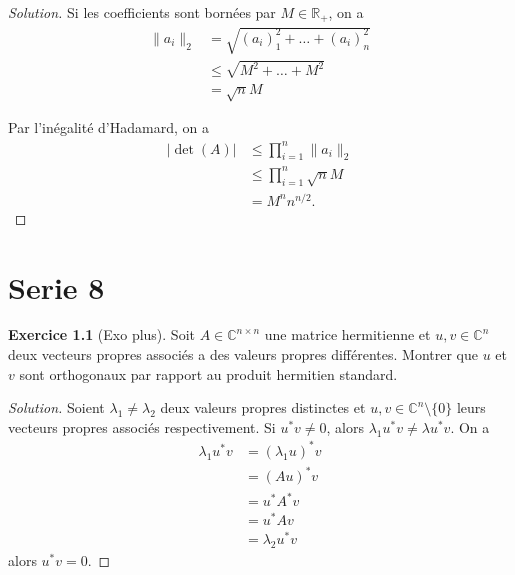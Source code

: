 \documentclass[a4paper,12pt,french]{report}
\theoremstyle{plain}
\theoremstyle{definition}
\newtheorem{exercise}{Exercice}[chapter]
\begin{document}
\begin{proof}[Solution]
Si les coefficients sont bornées par $M\in \mathbb{R}_{+}$, on a 
\begin{align*}
\lVert a_{i} \rVert _{2} & =\sqrt{ (a_{i})_{1}^{2}+\dots +(a_{i})_{n}^{2} } \\
 & \le \sqrt{ M^{2}+\dots +M^{2} } \\
 & =\sqrt{ n }M
\end{align*}

Par l'inégalité d'Hadamard, on a 
\begin{align*}
|\det(A)| & \le \prod_{i=1}^{n} \lVert a_{i}\rVert_{2} \\
 & \le \prod_{i=1}^{n} \sqrt{ n }M \\
  & =M^{n}n^{n/2}.
\end{align*}
\end{proof}

\chapter{Serie 8}

\begin{exercise}[Exo plus]
Soit $A\in \mathbb{C}^{n\times n}$ une matrice hermitienne et $u,v\in \mathbb{C}^{n}$ deux vecteurs propres associés a des valeurs propres différentes. Montrer que $u$ et $v$ sont orthogonaux par rapport au produit hermitien standard.
\end{exercise}
\begin{proof}[Solution]
Soient $\lambda_{1}\neq\lambda_{2}$ deux valeurs propres distinctes et $u,v\in \mathbb{C}^{n}\setminus \{ 0 \}$ leurs vecteurs propres associés respectivement. Si $u^{*}v\neq 0$, alors $\lambda_{1}u^{*}v\neq\lambda u^{*}v$. On a
\begin{align*}
\lambda_{1}u^{*}v & =(\lambda_{1}u)^{*}v \\
 & =(Au)^{*}v \\
 & =u^{*}A^{*}v \\
 & =u^{*}Av \\
 & =\lambda_{2}u^{*}v
\end{align*}
alors $u^{*}v=0$.
\end{proof}
\end{document}
